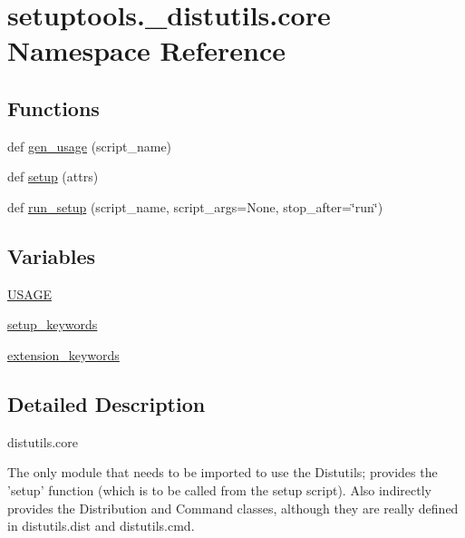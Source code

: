 \hypertarget{namespacesetuptools_1_1__distutils_1_1core}{}\section{setuptools.\+\_\+distutils.\+core Namespace Reference}
\label{namespacesetuptools_1_1__distutils_1_1core}
\subsection*{Functions}
\begin{DoxyCompactItemize}
\item 
def \hyperlink{namespacesetuptools_1_1__distutils_1_1core_adb8f605eb0e9d85ea8d6ed878f127245}{gen\+\_\+usage} (script\+\_\+name)
\item 
def \hyperlink{namespacesetuptools_1_1__distutils_1_1core_a6f94e9f9536e6b558c2f6e7a0077ec47}{setup} (attrs)
\item 
def \hyperlink{namespacesetuptools_1_1__distutils_1_1core_a275c69fa82364f007c1e4c1f067a9d1c}{run\+\_\+setup} (script\+\_\+name, script\+\_\+args=None, stop\+\_\+after=\char`\"{}run\char`\"{})
\end{DoxyCompactItemize}
\subsection*{Variables}
\begin{DoxyCompactItemize}
\item 
\hyperlink{namespacesetuptools_1_1__distutils_1_1core_a888f6a1a55a9c742cdc8d12cfcddb990}{U\+S\+A\+GE}
\item 
\hyperlink{namespacesetuptools_1_1__distutils_1_1core_a7920d942fb997605b456febec3e0669b}{setup\+\_\+keywords}
\item 
\hyperlink{namespacesetuptools_1_1__distutils_1_1core_aff7fc83db6e6430d082c69c85493baf9}{extension\+\_\+keywords}
\end{DoxyCompactItemize}


\subsection{Detailed Description}
\begin{DoxyVerb}distutils.core

The only module that needs to be imported to use the Distutils; provides
the 'setup' function (which is to be called from the setup script).  Also
indirectly provides the Distribution and Command classes, although they are
really defined in distutils.dist and distutils.cmd.
\end{DoxyVerb}
 

